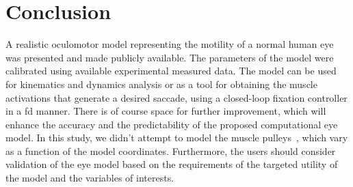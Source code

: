\documentclass[11pt,a4paper,draft=false]{report}
\begin{document}
\section*{Conclusion}\label{sec:concluison}

A realistic oculomotor model representing the motility of a normal human eye was
presented and made publicly available. The parameters of the model were
calibrated using available experimental measured data. The model can be used for
kinematics and dynamics analysis or as a tool for obtaining the muscle
activations that generate a desired saccade, using a closed-loop fixation
controller in a \gls{fd} manner. There is of course space for further
improvement, which will enhance the accuracy and the predictability of the
proposed computational eye model. In this study, we didn't attempt to model the
muscle pulleys~\cite{Kono2002a}, which vary as a function of the model
coordinates. Furthermore, the users should consider validation of the eye model
based on the requirements of the targeted utility of the model and the variables
of interests.




\end{document}
